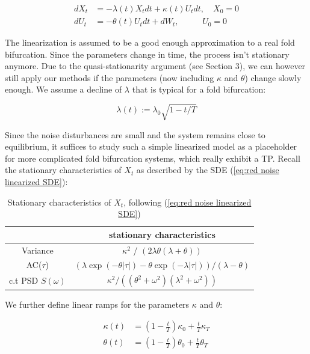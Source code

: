 \documentclass[%
thesis=student,%
coverpage=false,%
titlepage=false,%
headmarks=true, %
english,%
font=libertine, %
math=newpxtx, %
BCOR=5mm,%
coverBCOR=11mm%
]{tumbook}
\begin{document}
    \begin{equation}
    \begin{aligned}
        dX_{t} &= -\lambda(t) X_{t}dt + \kappa(t) U_{t}dt, \quad X_{0} = 0 \\
        dU_{t} &= -\theta(t) U_{t}dt + dW_{t}, \quad \ \ \ \ \ \ \ \ U_{0} = 0
    \end{aligned}
    \label{failure of TEWS SDE}
    \end{equation}

The linearization is assumed to be a good enough approximation to a real fold bifurcation. Since the parameters change in time, the process isn't stationary anymore. Due to the quasi-stationarity argument (see Section 3), we can however still apply our methods if the parameters (now including $\kappa$ and $\theta$) change slowly enough.
We assume a decline of $\lambda$ that is typical for a fold bifurcation: 

\begin{equation}
    \lambda(t) := \lambda_{0}\sqrt{1-t/T}
    \label{recovery rate}
\end{equation}
    
Since the noise disturbances are small and the system remains close to equilibrium, it suffices to study such a simple linearized model as a placeholder for more complicated fold bifurcation systems, which really exhibit a TP. 
Recall the stationary characteristics of $X_{t}$ as described by the SDE (\ref{eq:red noise linearized SDE}): 

\begin{table}[h!]
\centering
\begin{tabular}{|c|c|}
\hline
& stationary characteristics\\
\hline
Variance & $\kappa^2$ / $(2\lambda\theta(\lambda + \theta))$\\
AC($\tau$) & $(\lambda\exp(-\theta\lvert\tau\rvert)-\theta\exp(-\lambda\lvert\tau\rvert))/(\lambda - \theta)$\\
c.t PSD $S(\omega)$ & $\kappa^2/((\theta^2 + \omega^2)(\lambda^2 + \omega^2))$\\
\hline
\end{tabular}
\caption{Stationary characteristics of $X_{t}$, following (\ref{eq:red noise linearized SDE})}
\label{tab:simple_table}
\end{table}

We further define linear ramps for the parameters $\kappa$ and $\theta$:

\begin{subequations}
    \begin{align*}
        \kappa(t) &= (1-\frac{t}{T})\kappa_{0} + \frac{t}{T}\kappa_{T} \\
        \theta(t) &= (1-\frac{t}{T})\theta_{0} + \frac{t}{T}\theta_{T}
    \end{align*}
\end{subequations}
\end{document}
